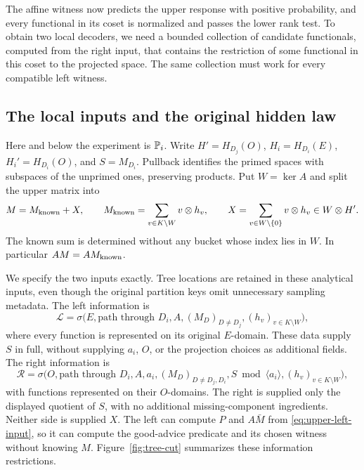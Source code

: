 The affine witness now predicts the upper response with positive probability,
and every functional in its coset is normalized and passes the lower rank
test.  To obtain two local decoders, we need a bounded collection of candidate
functionals, computed from the right input, that contains the restriction of
some functional in this coset to the projected space.  The same collection
must work for every compatible left witness.

\subsection{The local inputs and the original hidden law}\label{sec:right-hidden-law}

Here and below the experiment is $\mathbb P_i$.  Write
$H'=H_{D_j}(O)$, $H_i=H_{D_i}(E)$, $H_i'=H_{D_i}(O)$, and
$S=M_{D_i}$.  Pullback identifies the primed spaces with subspaces of the
unprimed ones, preserving products.  Put $W=\ker A$ and split the upper
matrix into
\begin{equation}\label{eq:upper-hidden}
 M=M_{\rm known}+X,\qquad
 M_{\rm known}=\sum_{v\in K\setminus W}v\otimes h_v,\qquad
 X=\sum_{v\in W\setminus\{0\}}v\otimes h_v\in W\otimes H'.
\end{equation}
The known sum is determined without any bucket whose index lies in $W$.
In particular $AM=AM_{\rm known}$.

We specify the two inputs exactly.  Tree locations are retained in these
analytical inputs, even though the original partition keys omit unnecessary
sampling metadata.  The left information is
\begin{equation}\label{eq:upper-left-input}
 \mathcal L=\sigma\bigl(E,\text{path through }D_i,A,
       (M_D)_{D\ne D_j},(h_v)_{v\in K\setminus W}\bigr),
\end{equation}
where every function is represented on its original $E$-domain.  These
data supply $S$ in full, without supplying $a_i$, $O$, or the
projection choices as additional fields.  The right information is
\begin{equation}\label{eq:upper-right-input}
 \mathcal R=\sigma\bigl(O,\text{path through }D_i,A,a_i,
       (M_D)_{D\ne D_j,D_i},S\bmod\langle a_i\rangle,
       (h_v)_{v\in K\setminus W}\bigr),
\end{equation}
with functions represented on their $O$-domains.  The right is supplied
only the displayed quotient of $S$, with no additional missing-component
ingredients.  Neither side is supplied $X$.  The left can compute $P$ and $A\bar M$ from
\eqref{eq:upper-left-input}, so it can compute the good-advice predicate
and its chosen witness without knowing $M$.
Figure~\ref{fig:tree-cut} summarizes these information restrictions.

